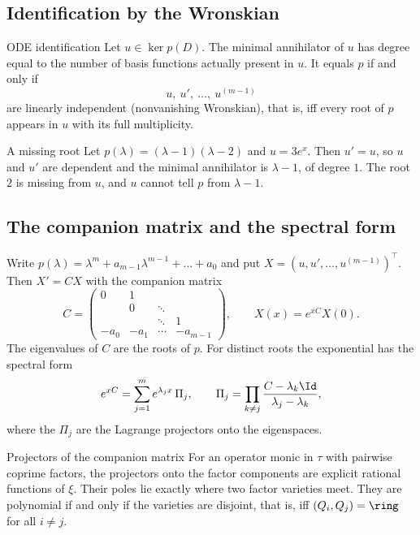 \subsection{Identification by the Wronskian}

\begin{proposition}{ODE identification  \proved}\label{prop:ode-ident}
Let $u\in\ker p(D)$. The minimal annihilator of $u$ has degree equal to the number of basis functions actually present in $u$. It equals $p$ if and only if
\[
u,\ u',\ \dots,\ u^{(m-1)}
\]
are linearly independent (nonvanishing Wronskian), that is, iff every root of $p$ appears in $u$ with its full multiplicity.

\end{proposition}

\begin{example}{A missing root}
Let $p(\lambda)=(\lambda-1)(\lambda-2)$ and $u=3e^{x}$. Then $u'=u$, so $u$ and $u'$ are dependent and the minimal annihilator is $\lambda-1$, of degree $1$. The root $2$ is missing from $u$, and $u$ cannot tell $p$ from $\lambda-1$.
\end{example}

\subsection{The companion matrix and the spectral form}

Write $p(\lambda)=\lambda^m+a_{m-1}\lambda^{m-1}+\dots+a_0$ and put $X=(u,u',\dots,u^{(m-1)})^{\top}$. Then $X'=CX$ with the companion matrix
\[
C=\begin{pmatrix}0&1&&\\&0&\ddots&\\&&\ddots&1\\-a_0&-a_1&\cdots&-a_{m-1}\end{pmatrix},
\qquad X(x)=e^{xC}X(0).
\]
The eigenvalues of $C$ are the roots of $p$. For distinct roots the exponential has the spectral form
\begin{equation}\label{eq:spectral}
e^{xC}=\sum_{j=1}^me^{\lambda_jx}\,\Pi_j,\qquad
\Pi_j=\prod_{k\ne j}\frac{C-\lambda_k\Id}{\lambda_j-\lambda_k},
\end{equation}
where the $\Pi_j$ are the Lagrange projectors onto the eigenspaces.

\begin{proposition}{Projectors of the companion matrix  \proved}\label{prop:proj}
For an operator monic in $\tau$ with pairwise coprime factors, the projectors onto the factor components are explicit rational functions of $\xi$. Their poles lie exactly where two factor varieties meet. They are polynomial if and only if the varieties are disjoint, that is, iff $(Q_i,Q_j)=\ring$ for all $i\ne j$.

\end{proposition}

